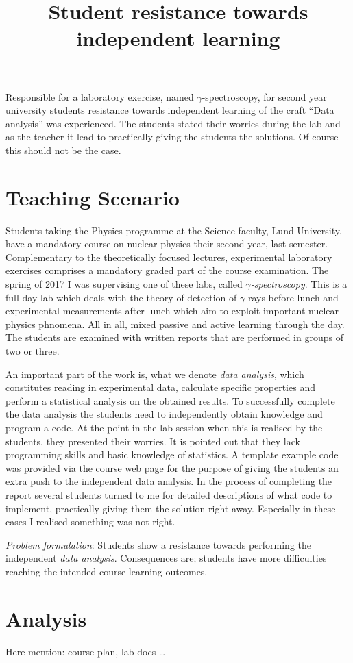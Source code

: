 \documentclass[]{article}
\title{Student resistance towards independent learning}
\begin{document}
Responsible for a laboratory exercise, named $\gamma$-spectroscopy, for second year university students resistance towards independent learning of the craft ``Data analysis'' was experienced. The students stated their worries during the lab and as the teacher it lead to practically giving the students the solutions. Of course this should not be the case.

\section*{Teaching Scenario}
Students taking the Physics programme at the Science faculty, Lund University, have a mandatory course on nuclear physics their second year, last semester.
Complementary to the theoretically focused lectures, experimental laboratory exercises comprises a mandatory graded part of the course examination.
The spring of 2017 I was supervising one of these labs, called {\it $\gamma$-spectroscopy}.
This is a full-day lab which deals with the theory of detection of $\gamma$ rays before lunch and experimental measurements after lunch which aim to exploit important nuclear physics phnomena.
All in all, mixed passive and active learning through the day.
The students are examined with written reports that are performed in groups of two or three.


An important part of the work is, what we denote {\it data analysis}, which constitutes reading in experimental data, calculate specific properties and perform a statistical analysis on the obtained results.
To successfully complete the data analysis the students need to independently obtain knowledge and program a code.
At the point in the lab session when this is realised by the students, they presented their worries.
It is pointed out that they lack programming skills and basic knowledge of statistics.
A template example code was provided via the course web page for the purpose of giving the students an extra push to the independent data analysis.
In the process of completing the report several students turned to me for detailed descriptions of what code to implement, practically giving them the solution right away.
Especially in these cases I realised something was not right.

{\it Problem formulation}: Students show a resistance towards performing the independent {\it data analysis}. Consequences are; students have more difficulties reaching the intended course learning outcomes.


\section*{Analysis}
Here mention: course plan, lab docs \dots
\end{document}
